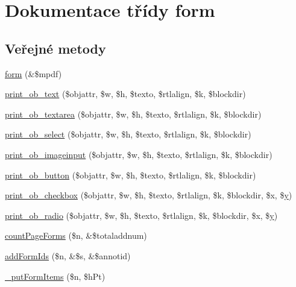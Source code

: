\hypertarget{classform}{\section{Dokumentace třídy form}
\label{classform}
}
\subsection*{Veřejné metody}
\begin{DoxyCompactItemize}
\item 
\hyperlink{classform_a32bcb75a4f874517050194db1ad30ef8}{form} (\&\$mpdf)
\item 
\hyperlink{classform_a4bdc6bc87bbcb02436f8efe74440f2c9}{print\-\_\-ob\-\_\-text} (\$objattr, \$w, \$h, \$texto, \$rtlalign, \$k, \$blockdir)
\item 
\hyperlink{classform_a48fd54c765fb33f80b1a7809fa7e09df}{print\-\_\-ob\-\_\-textarea} (\$objattr, \$w, \$h, \$texto, \$rtlalign, \$k, \$blockdir)
\item 
\hyperlink{classform_a0429db8a98cc18fd8210cb9ddbc3ee38}{print\-\_\-ob\-\_\-select} (\$objattr, \$w, \$h, \$texto, \$rtlalign, \$k, \$blockdir)
\item 
\hyperlink{classform_aface32875e3a62db968f55ed40bc10f2}{print\-\_\-ob\-\_\-imageinput} (\$objattr, \$w, \$h, \$texto, \$rtlalign, \$k, \$blockdir)
\item 
\hyperlink{classform_a73ac04ef1d2bb6de4dfbeed339834c6d}{print\-\_\-ob\-\_\-button} (\$objattr, \$w, \$h, \$texto, \$rtlalign, \$k, \$blockdir)
\item 
\hyperlink{classform_a65cd2449f338f570434ddea444b11ced}{print\-\_\-ob\-\_\-checkbox} (\$objattr, \$w, \$h, \$texto, \$rtlalign, \$k, \$blockdir, \$x, \$\hyperlink{example43___m_p_d_f_i__booklet_8php_a3f83be162d14f38451e1bc419fbbbcbc}{y})
\item 
\hyperlink{classform_ab813359bb64cc2f78fade006923d3218}{print\-\_\-ob\-\_\-radio} (\$objattr, \$w, \$h, \$texto, \$rtlalign, \$k, \$blockdir, \$x, \$\hyperlink{example43___m_p_d_f_i__booklet_8php_a3f83be162d14f38451e1bc419fbbbcbc}{y})
\item 
\hyperlink{classform_a3c1a7a5dc7d9336dd855f4fa1c2e4346}{count\-Page\-Forms} (\$n, \&\$totaladdnum)
\item 
\hyperlink{classform_a1b06db646babc28b0d2e1ecb3c757d6c}{add\-Form\-Ids} (\$n, \&\$s, \&\$annotid)
\item 
\hyperlink{classform_aab313ca6d4b052eb2152d7d677137379}{\-\_\-put\-Form\-Items} (\$n, \$h\-Pt)
\item 

\end{DoxyCompactItemize}
